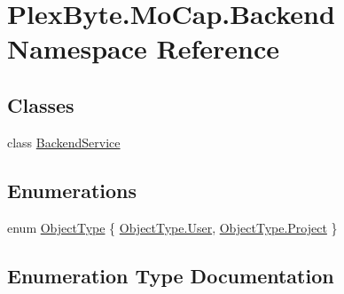\hypertarget{namespace_plex_byte_1_1_mo_cap_1_1_backend}{}\section{Plex\+Byte.\+Mo\+Cap.\+Backend Namespace Reference}
\label{namespace_plex_byte_1_1_mo_cap_1_1_backend}
\subsection*{Classes}
\begin{DoxyCompactItemize}
\item 
class \hyperlink{class_plex_byte_1_1_mo_cap_1_1_backend_1_1_backend_service}{Backend\+Service}
\end{DoxyCompactItemize}
\subsection*{Enumerations}
\begin{DoxyCompactItemize}
\item 
enum \hyperlink{namespace_plex_byte_1_1_mo_cap_1_1_backend_acbe18958b9ae9c08f5c2d2c580fbbf2a}{Object\+Type} \{ \hyperlink{namespace_plex_byte_1_1_mo_cap_1_1_backend_acbe18958b9ae9c08f5c2d2c580fbbf2aa8f9bfe9d1345237cb3b2b205864da075}{Object\+Type.\+User}, 
\hyperlink{namespace_plex_byte_1_1_mo_cap_1_1_backend_acbe18958b9ae9c08f5c2d2c580fbbf2aa9e727fdd3aec8274f46685441900280d}{Object\+Type.\+Project}
 \}
\end{DoxyCompactItemize}


\subsection{Enumeration Type Documentation}

